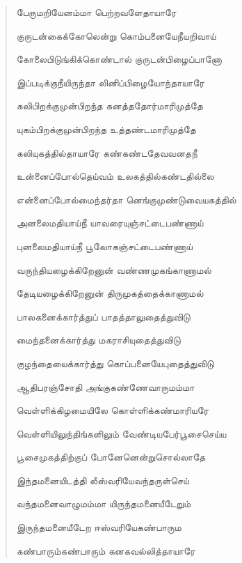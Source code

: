 \documentclass{article}
\begin{document}
\begin{quotation}
{பேருமறியேனம்மா பெற்றவளேதாயாரே

குருடன்கைக்கோலென்று கொம்பனையேநீயறிவாய்

கோலைபிடுங்கிக்கொண்டால் குருடன்பிழைப்பானோ

இப்படிக்குநீயிருந்தா லினிப்பிழையோந்தாயாரே

கலிபிறக்குமுன்பிறந்த கனத்ததோர்மாரிமுத்தே

யுகம்பிறக்குமுன்பிறந்த உத்தண்டமாரிமுத்தே

கலியுகத்தில்தாயாரே கண்கண்டதேவவனதநீ

உன்னைப்போல்தெய்வம் உலகத்தில்கண்டதில்லை

என்னைப்போல்மைந்தர்தா னெங்குமுண்டுவையகத்தில்

அனலைமதியாய்நீ யாவரையுஞ்சட்டைபண்ணாய்

புனலைமதியாய்நீ பூலோகஞ்சட்டைபண்ணாய்

வருந்தியழைக்கிறேனுன் வண்ணமுகங்காணாமல்

தேடியழைக்கிறேனுன்‌ திருமுகத்தைக்காணாமல்‌

பாலகனைக்கார்த்துப் பாதத்தாலுதைத்துவிடு

மைந்தனைக்கார்த்து மகராசியுதைத்துவிடு

குழந்தையைக்கார்த்து கொப்பனையேபுதைத்துவிடு

ஆதிபரஞ்சோதி அங்குகண்ணேவாருமம்மா

வெள்ளிக்கிழமையிலே கொள்ளிக்கண்மாரியரே

வெள்ளியிலுந்திங்களிலும் வேண்டியபேர்பூசைசெய்ய

பூசைமுகத்திற்குப் போனேனென்றுசொல்லாதே

இந்தமனையிடத்தி லீஸ்வரியேவந்தருள்செய்

வந்தமனைவாழுமம்மா யிருந்தமனையீடேறும்

இருந்தமனையீடேற ஈஸ்வரியேகண்பாரும

கண்பாரும்கண்பாரும் கனகவல்லித்தாயாரே


}
\end{quotation}
\end{document}
